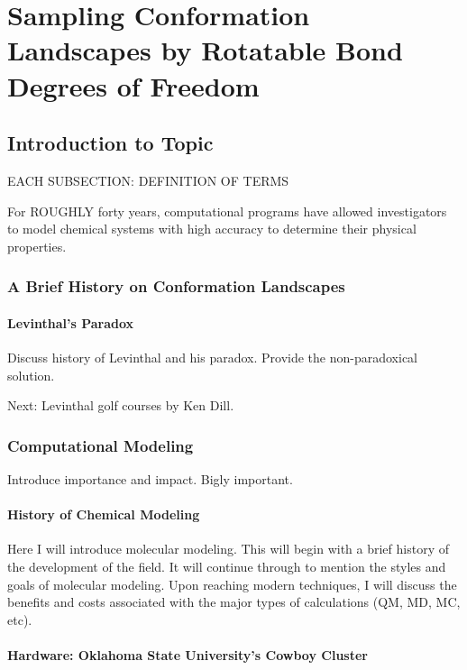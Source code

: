 \chapter{Sampling Conformation Landscapes by Rotatable Bond Degrees of Freedom}
\label{ch:ConformationLandscape}

\section{Introduction to Topic}

EACH SUBSECTION: DEFINITION OF TERMS

For ROUGHLY forty years, computational programs have allowed investigators to model chemical systems with high accuracy to determine their physical properties.

\subsection{A Brief History on Conformation Landscapes}

\subsubsection{Levinthal's Paradox}

Discuss history of Levinthal and his paradox. Provide the non-paradoxical solution.

Next: Levinthal golf courses by Ken Dill.

\subsection{Computational Modeling}

Introduce importance and impact. Bigly important.

\subsubsection{History of Chemical Modeling}

Here I will introduce molecular modeling. This will begin with a brief history of the development of the field. It will continue through to mention the styles and goals of molecular modeling. Upon reaching modern techniques, I will discuss the benefits and costs associated with the major types of calculations (QM, MD, MC, etc). 

\subsubsection{Hardware: Oklahoma State University's Cowboy Cluster}

